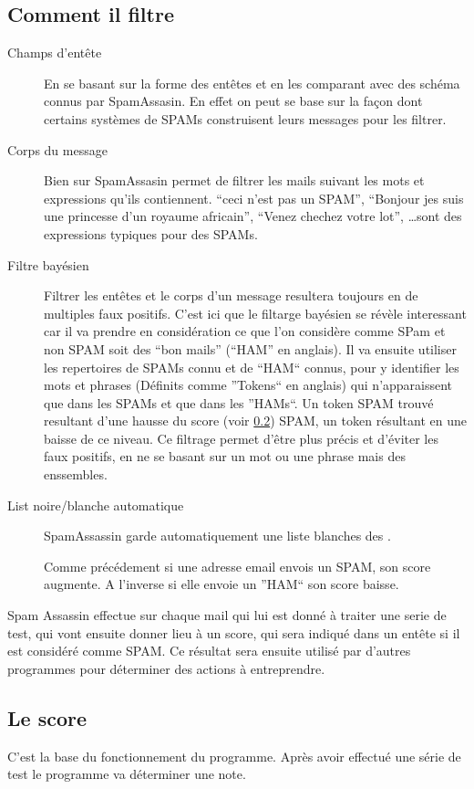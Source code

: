 \documentclass[a4paper,11pt]{article}
\begin{document}
\subsection{Comment il filtre}

\begin{description}
 \item [Champs d'entête] En se basant sur la forme des entêtes et en les comparant avec des schéma connus par SpamAssasin. En effet 
 on peut se base sur la façon dont certains systèmes de SPAMs construisent leurs messages pour les filtrer. 
 \item [Corps du message] Bien sur SpamAssasin permet de filtrer les mails suivant les mots et expressions qu'ils contiennent. 
 ``ceci n'est pas un SPAM'', ``Bonjour jes suis une princesse d'un royaume africain'', ``Venez chechez votre lot'', \dots sont des expressions
 typiques pour des SPAMs. 
 \item [Filtre bayésien] Filtrer les entêtes et le corps d'un message resultera toujours en de multiples faux positifs. C'est ici que le filtarge 
 bayésien se révèle interessant car il va prendre en considération ce que l'on considère comme SPam et non SPAM soit des ``bon mails'' (``HAM'' en anglais).
 Il va ensuite utiliser les repertoires de SPAMs connu et de ``HAM``  connus, pour y identifier les mots et phrases (Définits comme ''Tokens`` en anglais)
 qui n'apparaissent que dans les SPAMs et que dans les ''HAMs``.
 Un token SPAM trouvé resultant d'une hausse du score (voir \ref{score}) SPAM, un token résultant en une baisse de ce niveau. Ce filtrage permet d'être plus précis et d'éviter les faux positifs, 
 en ne se basant sur un mot ou une phrase mais des enssembles. 
 \item [List noire/blanche automatique] SpamAssassin garde automatiquement une liste blanches des .
 
 Comme précédement si une adresse email envois un SPAM, son score augmente. A l'inverse si elle envoie un ''HAM`` son score baisse. 
 
\end{description} 


Spam Assassin effectue sur chaque mail qui lui est donné à traiter une serie de test, qui vont ensuite donner lieu à un score, qui sera indiqué dans un entête si il est considéré comme SPAM. 
Ce résultat sera ensuite utilisé par d'autres programmes pour déterminer des actions à entreprendre.


\subsection{Le score} \label{score}
C'est la base du fonctionnement du programme.  Après avoir effectué une série de test le programme va déterminer une note. 
\pagebreak

\appendix
\end{document}
